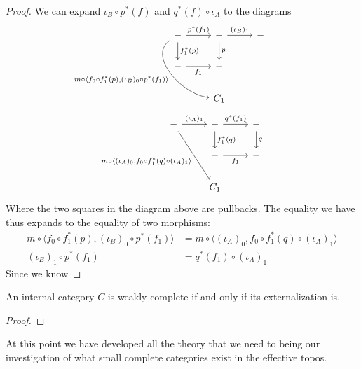 \begin{proof}
  We can expand $\iota_B \circ p^*(f)$ and
  $q^*(f) \circ \iota_A$ to the diagrams
  \[
    \begin{tikzcd}
      - \ar[rdd, bend right, out = 270, in = 230, swap, "{m \circ \langle f_0 \circ f_1^*(p), (\iota_B)_0 \circ p^*(f_1) \rangle}"]
        \ar[d, "f_1^*(p)"] \ar[r, "p^*(f_1)"] &
      - \ar[d, "p"] \ar[r, "(\iota_B)_1"] & -\\
      - \ar[r, swap, "f_1"] & - & &\\
      & C_1 & &
    \end{tikzcd}
  \]
  \[
    \begin{tikzcd}
      - \ar[r, "(\iota_A)_1"] \ar[ddr, swap, "{m \circ \langle (\iota_A)_0, f_0 \circ f_1^*(q) \circ (\iota_A)_1 \rangle}"]&
      - \ar[r, "q^*(f_1)"] \ar[d, "f_1^*(q)"] & - \ar[d, "q"]\\
      & - \ar[r, swap, "f_1"] & -\\
      & C_1 &
    \end{tikzcd}
  \]
  Where the two squares in the diagram above are pullbacks. The
  equality we have thus expands to the equality of two morphisms:
  \begin{align*}
    m \circ \langle f_0 \circ f_1^*(p), (\iota_B)_0 \circ p^*(f_1) \rangle &=
    m \circ \langle (\iota_A)_0, f_0 \circ f_1^*(q) \circ (\iota_A)_1 \rangle\\
    (\iota_B)_1 \circ p^*(f_1) &= q^*(f_1) \circ (\iota_A)_1
  \end{align*}
  Since we know


\end{proof}

\begin{thm}\label{thm:complete:completeexternalization}
  An internal category $C$ is weakly complete if and only if its
  externalization is.
\end{thm}
\begin{proof}

\end{proof}
At this point we have developed all the theory that we need to being
our investigation of what small complete categories exist in the
effective topos.

